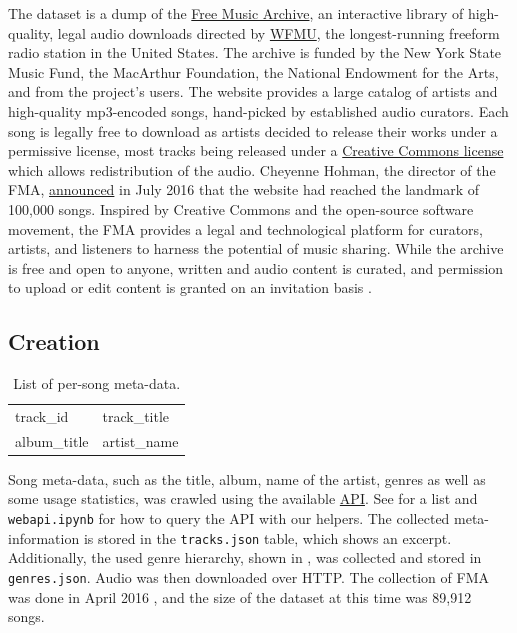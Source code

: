\documentclass{article}
\newcommand{\todo}[1]{{\color{red} #1 }}
\begin{document}
The dataset is a dump of the \href{https://freemusicarchive.org/}{Free Music Archive}, an interactive library of high-quality, legal audio downloads directed by \href{https://wfmu.org/}{WFMU}, the longest-running freeform radio station in the United States.
The archive is funded by the New York State Music Fund, the MacArthur Foundation, the National Endowment for the Arts, and from the project's users.
The website provides a large catalog of artists and high-quality mp3-encoded songs, hand-picked by established audio curators. Each song is legally free to download as artists decided to release their works under a permissive license, most tracks being released under a \href{https://creativecommons.org/}{Creative Commons license} which allows redistribution of the audio. Cheyenne Hohman, the director of the FMA, \href{http://freemusicarchive.org/member/cheyenne_h/blog/100000_SONGS}{announced} in July 2016 that the website had reached the landmark of 100,000 songs.
Inspired by Creative Commons and the open-source software movement, the FMA provides a legal and technological platform for curators, artists, and listeners to harness the potential of music sharing. While the archive is free and open to anyone, written and audio content is curated, and permission to upload or edit content is granted on an invitation basis \cite{art:MossFMA}.

\subsection{Creation} %

\begin{table}
	\centering
	\begin{tabular}{|ll|}
		\hline
		track\_id & track\_title \\
		album\_title & artist\_name \\
		\hline
	\end{tabular}
	\caption{List of per-song meta-data.}
	\label{tab:metadata}
\end{table}

Song meta-data, such as the title, album, name of the artist, genres as well as some usage statistics, was crawled using the available \href{https://freemusicarchive.org/api}{API}. See  for a list and \texttt{webapi.ipynb} for how to query the API with our helpers. The collected meta-information is stored in the \texttt{tracks.json} table, which  shows an excerpt. Additionally, the used genre hierarchy, shown in , was collected and stored in \texttt{genres.json}. Audio was then downloaded over HTTP. The collection of FMA was done in \todo{April 2016}, and the size of the dataset at this time was 89,912 songs.
\end{document}

